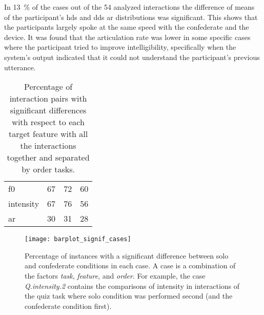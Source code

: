 In \SI{13}{\percent} of the cases out of the 54 analyzed interactions the difference of means of the participant's \ac{hds} and \ac{dds} \ac{ar} distributions was significant.
This shows that the participants largely spoke at the same speed with the confederate and the device.
It was found that the articulation rate was lower in some specific cases where the participant tried to improve intelligibility, specifically when the system's output indicated that it could not understand the participant's previous utterance.
%
\begin{table}[t]
	\centering
	\caption[Percentage of significantly different interaction pairs in addressee component]
	{Percentage of interaction pairs with significant differences with respect to each target feature with all the interactions together and separated by order tasks.}
	\label{tab:signif_conditions}
	\begin{tabularx}{\linewidth}{XSSS}
		\toprule
		 & {} & {}	& {}\\
		\midrule
		\acs{f0}	& 67	& 72	& 60 \\
		intensity 	& 67	& 76	& 56 \\
		\acs{ar}	& 30	& 31	& 28 \\
		\bottomrule	
	\end{tabularx}
\end{table}
%
\begin{figure}[t]
	\centering
	\texttt{[image: barplot\_signif\_cases]}
	\caption[Per-case comparison of significant distributional differences in the crowd component]
		{Percentage of instances with a significant difference between solo and confederate conditions in each case.
		A case is a combination of the factors \emph{task}, \emph{feature}, and \emph{order}.
		For example, the case \emph{Q.intensity.2} contains the comparisons of intensity in interactions of the quiz task where solo condition was performed second (and the confederate condition first).}
	\label{fig:signif_cases_ordered}
\end{figure}
%
